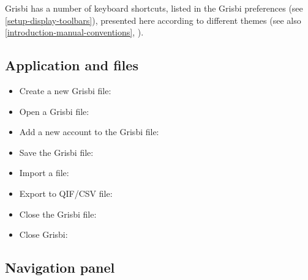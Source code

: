 Grisbi has a number of keyboard shortcuts, listed in the Grisbi preferences (see \vref{setup-display-toolbars}), presented here according to different themes (see also  \vref{introduction-manual-conventions}, ).

\subsection{Application and files}

\begin{itemize}
	\item Create a new Grisbi file: %
	\item Open a Grisbi file: %
	\item Add a new account to the Grisbi file: %
	\item Save the Grisbi file: %
	\item Import a file: %
	\item Export to \gls{QIF}/\gls{CSV} file: %
	\item Close the Grisbi file: %
	\item Close Grisbi: %
\end{itemize}



\subsection{Navigation panel}

